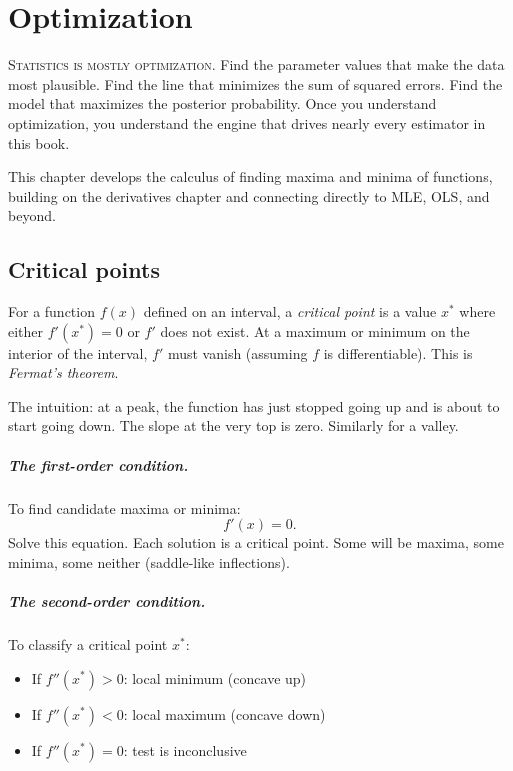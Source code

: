 \chapter{Optimization}
\label{ch:optimization}

\noindent\textsc{Statistics is mostly optimization.} Find the parameter values that make the data most plausible. Find the line that minimizes the sum of squared errors. Find the model that maximizes the posterior probability. Once you understand optimization, you understand the engine that drives nearly every estimator in this book.

This chapter develops the calculus of finding maxima and minima of functions, building on the derivatives chapter and connecting directly to MLE, OLS, and beyond.

\section{Critical points}

For a function $f(x)$ defined on an interval, a \emph{critical point} is a value $x^*$ where either $f'(x^*) = 0$ or $f'$ does not exist. At a maximum or minimum on the interior of the interval, $f'$ must vanish (assuming $f$ is differentiable). This is \emph{Fermat's theorem}.

The intuition: at a peak, the function has just stopped going up and is about to start going down. The slope at the very top is zero. Similarly for a valley.

\paragraph{The first-order condition.} To find candidate maxima or minima:
\begin{equation}
  f'(x) = 0.
  \label{eq:foc-univariate}
\end{equation}
Solve this equation. Each solution is a critical point. Some will be maxima, some minima, some neither (saddle-like inflections).

\paragraph{The second-order condition.} To classify a critical point $x^*$:
\begin{itemize}[noitemsep]
\item If $f''(x^*) > 0$: local minimum (concave up)
\item If $f''(x^*) < 0$: local maximum (concave down)
\item If $f''(x^*) = 0$: test is inconclusive
\end{itemize}

